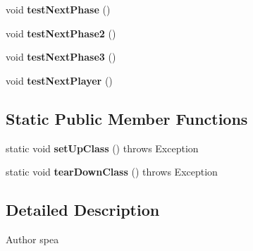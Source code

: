 \begin{DoxyCompactItemize}
\item 
\hypertarget{classdominion_1_1control_1_1ControlImplTest_a67b53ff0bbfe3ae47d05e189e87ffe61}{void {\bfseries test\-Next\-Phase} ()}\label{classdominion_1_1control_1_1ControlImplTest_a67b53ff0bbfe3ae47d05e189e87ffe61}

\item 
\hypertarget{classdominion_1_1control_1_1ControlImplTest_a6c1a3f5cf859b03988166d061a3d05be}{void {\bfseries test\-Next\-Phase2} ()}\label{classdominion_1_1control_1_1ControlImplTest_a6c1a3f5cf859b03988166d061a3d05be}

\item 
\hypertarget{classdominion_1_1control_1_1ControlImplTest_a8da1aeb3905df3c9ad1954eb79723a2b}{void {\bfseries test\-Next\-Phase3} ()}\label{classdominion_1_1control_1_1ControlImplTest_a8da1aeb3905df3c9ad1954eb79723a2b}

\item 
\hypertarget{classdominion_1_1control_1_1ControlImplTest_ac7f4b7adbd45bb8ff0d4b8fa0263434f}{void {\bfseries test\-Next\-Player} ()}\label{classdominion_1_1control_1_1ControlImplTest_ac7f4b7adbd45bb8ff0d4b8fa0263434f}

\end{DoxyCompactItemize}
\subsection*{\-Static \-Public \-Member \-Functions}
\begin{DoxyCompactItemize}
\item 
\hypertarget{classdominion_1_1control_1_1ControlImplTest_acb6cdf299a975ed3594d919153bdbe22}{static void {\bfseries set\-Up\-Class} ()  throws Exception }\label{classdominion_1_1control_1_1ControlImplTest_acb6cdf299a975ed3594d919153bdbe22}

\item 
\hypertarget{classdominion_1_1control_1_1ControlImplTest_a6cdc36c2f3c3cd91351cd9a8c5e85dac}{static void {\bfseries tear\-Down\-Class} ()  throws Exception }\label{classdominion_1_1control_1_1ControlImplTest_a6cdc36c2f3c3cd91351cd9a8c5e85dac}

\end{DoxyCompactItemize}


\subsection{\-Detailed \-Description}
\begin{DoxyAuthor}{\-Author}
spea 
\end{DoxyAuthor}


